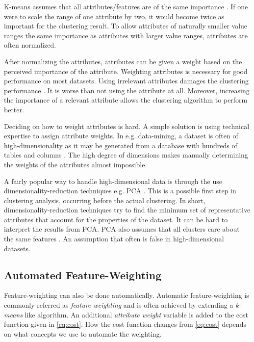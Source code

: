 \documentclass[../report.tex]{subfiles}
\begin{document}
K-means assumes that all attributes/features are of the same importance \cite{Kaufman1990}. If one were to scale the range of one attribute by two, it would become twice as important for the clustering result. To allow attributes of naturally smaller value ranges the same importance as attributes with larger value ranges, attributes are often normalized.

After normalizing the attributes, attributes can be given a weight based on the perceived importance of the attribute. Weighting attributes is necessary for good performance on most datasets. Using irrelevant attributes damages the clustering performance \cite{Kaufman1990}. It is worse than not using the attribute at all. Moreover, increasing the importance of a relevant attribute allows the clustering algorithm to perform better. %

Deciding on how to weight attributes is hard. A simple solution is using technical expertise to assign attribute weights. In e.g. data-mining, a dataset is often of high-dimensionality as it may be generated from a database with hundreds of tables and columns \cite{Jing2007}. The high degree of dimensions makes manually determining the weights of the attributes almost impossible.

A fairly popular way to handle high-dimensional data is through the use dimensionality-reduction techniques e.g. PCA \cite{Jolliffe2005,van2009}. This is a possible first step in clustering analysis, occurring before the actual clustering. In short, dimensionality-reduction techniques try to find the minimum set of representative attributes that account for the properties of the dataset. It can be hard to interpret the results from PCA. PCA also assumes that all clusters care about the same features \cite{Deng2010}. An assumption that often is false in high-dimensional datasets.

\subsection{Automated Feature-Weighting}
Feature-weighting can also be done automatically. Automatic feature-weighting is commonly referred as \textit{feature weighting} and is often achieved by extending a \textit{k-means} like algorithm. An additional \textit{attribute weight} variable is added to the cost function given in \ref{eq:cost}. How the cost function changes from \ref{eq:cost} depends on what concepts we use to automate the weighting.
\end{document}

